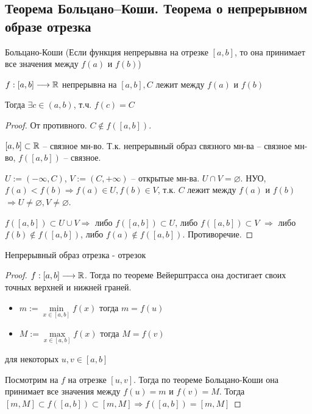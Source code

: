 
\subsection{Теорема Больцано–Коши. Теорема о непрерывном образе отрезка \href{https://youtu.be/E7inz4tp-6k?t=8060}{\Walley}}
\begin{theorem-non}
    Больцано-Коши (Если функция непрерывна на отрезке $[a, b]$, то она принимает все значения между $f(a)$ и $f(b)$)

    $f: [a, b] \longrightarrow \mathbb{R}$ непрерывна на $[a, b], C$ лежит между $f(a)$ и $f(b)$

    Тогда $\exists c\in (a, b)$, т.ч. $f(c) = C$
    \begin{proof} От противного. $C \notin f([a, b])$.

        $[a, b] \subset \mathbb{R}$ -- связное мн-во. Т.к. непрерывный образ связного 
        мн-ва -- связное мн-во, $f([a, b])$ -- связное. 
    
        $U := (-\infty, C)$, $V := (C, +\infty)$ -- открытые мн-ва.
        $U \cap V = \varnothing$. НУО, $f(a) < f(b) \Rightarrow
        f(a) \in U, f(b) \in V$, т.к. $C$ лежит между $f(a)$ и $f(b)$
        $\Rightarrow U \neq \varnothing, V \neq \varnothing$.
    
        $f([a, b]) \subset U \cup V \Rightarrow$ либо $f([a, b]) \subset U$,
        либо $f([a, b]) \subset V$ $\Rightarrow$ либо $f(b) \notin f([a, b])$,
        либо $f(a) \notin f([a, b])$. Противоречие.
    
    \end{proof}
\end{theorem-non}

\begin{theorem-non}
    Непрерывный образ отрезка - отрезок 

    \begin{proof} \quad

        $f:[a, b] \longrightarrow \mathbb{R}$.
        Тогда по теореме Вейерштрасса она достигает своих точных верхней и нижней граней.
        \begin{itemize}
            \item[] $m:= \min\limits_{x \in [a, b]}{f(x)}$ \qquad тогда $m = f(u)$
            \item[] $M:= \max\limits_{x \in [a, b]}{f(x)}$ \qquad тогда $M = f(v)$
        \end{itemize} для некоторых $u, v \in [a, b]$

        Посмотрим на $f$ на отрезке $[u, v]$. Тогда по теореме Больцано-Коши она принимает все значения между $f(u) = m$
        и $f(v) = M$. Тогда $[m, M] \subset f([a, b]) \subset [m, M] \Longrightarrow f([a, b]) = [m, M]$ 
    \end{proof}
\end{theorem-non}